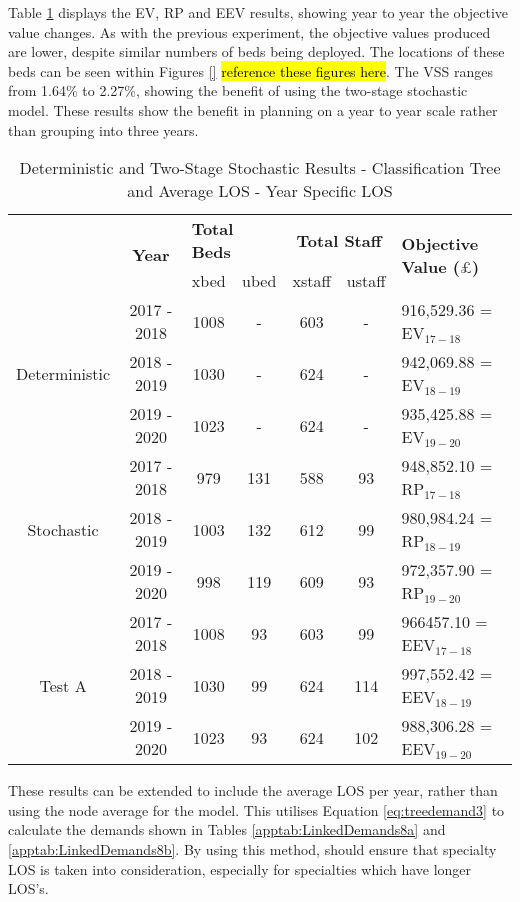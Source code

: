 \documentclass[../thesis.tex]{subfiles}
\begin{document}
Table \ref{tab:Results7} displays the EV, RP and EEV results, showing year to year the objective value changes. As with the previous experiment, the objective values produced are lower, despite similar numbers of beds being deployed. The locations of these beds can be seen within Figures \ref{} \hl{reference these figures here}. The VSS ranges from 1.64\% to 2.27\%, showing the benefit of using the two-stage stochastic model. These results show the benefit in planning on a year to year scale rather than grouping into three years. 

\begin{table}[h!]
    \centering
    \begin{tabular}{ccccccl}\toprule
 & \multirow{2}{*}{\textbf{Year}}& \multicolumn{2}{l}{\textbf{Total Beds}} & \multicolumn{2}{c}{\textbf{Total Staff}} & \multirow{2}{*}{\textbf{Objective Value ($\pounds$)}}\\ \cmidrule(lr){3-4} \cmidrule(lr){5-6}
&& xbed           & ubed          & xstaff         & ustaff         \\ \midrule
     \multirow{3}{*}{Deterministic} & 2017 - 2018 & 1008  & - & 603 & - & 916,529.36 =  EV$_{17-18}$ \\ 
      & 2018 - 2019 & 1030& - & 624  & - &  942,069.88 =  EV$_{18-19}$ \\
      & 2019 - 2020 & 1023  & - & 624 & - &   935,425.88 =  EV$_{19-20}$\\ \midrule
     \multirow{3}{*}{Stochastic} & 2017 - 2018 & 979 & 131 &588  & 93 &  948,852.10 =  RP$_{17-18}$ \\ 
      & 2018 - 2019 & 1003  &  132 & 612 & 99 &980,984.24 = RP$_{18-19}$ \\
      & 2019 - 2020 &998 &119  &609 &93 &  972,357.90 = RP$_{19-20}$\\ \midrule    
     \multirow{3}{*}{Test A} & 2017 - 2018 & 1008 & 93 & 603  &99  & 966457.10 = EEV$_{17-18}$ \\ 
      & 2018 - 2019& 1030 & 99 &  624& 114 & 997,552.42 = EEV$_{18-19}$ \\
      & 2019 - 2020 & 1023 & 93  & 624 &102 &  988,306.28 = EEV$_{19-20}$\\ \bottomrule       
    \end{tabular}
    \caption{Deterministic and Two-Stage Stochastic Results - Classification Tree and Average LOS - Year Specific LOS}
    \label{tab:Results7}
\end{table}



These results can be extended to include the average LOS per year, rather than using the node average for the model. This utilises Equation \eqref{eq:treedemand3} to calculate the demands shown in Tables \ref{apptab:LinkedDemands8a} and \ref{apptab:LinkedDemands8b}. By using this method, should ensure that specialty LOS is taken into consideration, especially for specialties which have longer LOS's.
\end{document}
